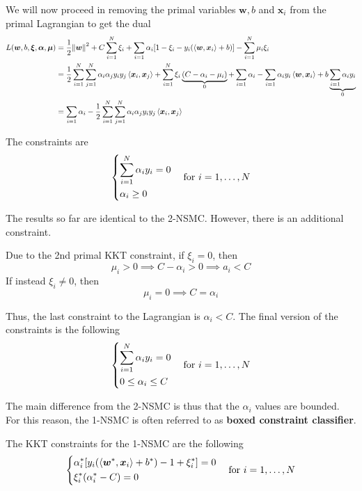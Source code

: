 \documentclass[oneside,onecolumn]{report}
\newcommand{\inp}[2]{\left\langle #1, #2 \right\rangle}
\begin{document}
We will now proceed in removing the primal variables $\bm w, b$ and $\bm x_i$ from the primal Lagrangian to get the dual
\begin{align*}
    L(\bm w, b, \bm \xi, \bm \alpha, \bm \mu)
    &= \frac{1}{2} \norm{\bm w}^2 + C \sum_{i = 1}^N \xi_i + \sum_{i = 1} \alpha_i [1 - \xi_i  - y_i (\inp{\bm w}{\bm x_i} + b)] - \sum_{i = 1}^N \mu_i \xi_i \\
    &= \frac{1}{2} \sum_{i = 1}^N \sum_{j = 1}^N \alpha_i \alpha_j y_i y_j \inp{\bm x_i}{\bm x_j} + \sum_{i = 1}^N \xi_i \underbrace{(C - \alpha_i - \mu_i)}_0 + \sum_{i = 1} \alpha_i - \sum_{i = 1} \alpha_i y_i \inp{\bm w}{\bm x_i} + b \underbrace{\sum_{i = 1} \alpha_i y_i}_0 \\
    &= \sum_{i = 1} \alpha_i - \frac{1}{2} \sum_{i = 1}^N \sum_{j = 1}^N \alpha_i \alpha_j y_i y_j \inp{\bm x_i}{\bm x_j}
\end{align*}

The constraints are
$$ \begin{dcases}
    \sum_{i = 1}^N \alpha_i y_i = 0\\
    \alpha_i \geq 0
\end{dcases} \quad \text{for } i = 1, \dots, N $$

The results so far are identical to the 2-NSMC.
However, there is an additional constraint.

Due to the 2nd primal KKT constraint, if $\xi_i = 0$, then
$$ \mu_i > 0 \implies C - \alpha_i > 0 \implies a_i < C $$
If instead $\xi_i \neq 0$, then
$$ \mu_i = 0 \implies C = \alpha_i $$

Thus, the last constraint to the Lagrangian is $\alpha_i < C$.
The final version of the constraints is the following
$$ \begin{dcases}
    \sum_{i = 1}^N \alpha_i y_i = 0\\
    0 \leq \alpha_i \leq C
\end{dcases} \quad \text{for } i = 1, \dots, N $$

The main difference from the 2-NSMC is thus that the $\alpha_i$ values are bounded.
For this reason, the 1-NSMC is often referred to as \textbf{boxed constraint classifier}.

The KKT constraints for the 1-NSMC are the following
$$ \begin{dcases}
    \alpha_i^* [y_i (\inp{\bm w^*}{\bm x_i} + b^*) - 1 + \xi_i^*] = 0 \\
    \xi_i^* (\alpha_i^* - C) = 0
\end{dcases} \quad \text{for } i = 1, \dots, N $$
\end{document}

